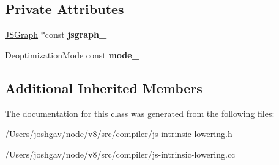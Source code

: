 \subsection*{Private Attributes}
\begin{DoxyCompactItemize}
\item 
\hyperlink{classv8_1_1internal_1_1compiler_1_1_j_s_graph}{J\+S\+Graph} $\ast$const {\bfseries jsgraph\+\_\+}\hypertarget{classv8_1_1internal_1_1compiler_1_1_j_s_intrinsic_lowering_a7fe42af2cfb580ff4c09088f0c885869}{}\label{classv8_1_1internal_1_1compiler_1_1_j_s_intrinsic_lowering_a7fe42af2cfb580ff4c09088f0c885869}

\item 
Deoptimization\+Mode const {\bfseries mode\+\_\+}\hypertarget{classv8_1_1internal_1_1compiler_1_1_j_s_intrinsic_lowering_ad3532415c48ff587fa99b48770b050dc}{}\label{classv8_1_1internal_1_1compiler_1_1_j_s_intrinsic_lowering_ad3532415c48ff587fa99b48770b050dc}

\end{DoxyCompactItemize}
\subsection*{Additional Inherited Members}


The documentation for this class was generated from the following files\+:\begin{DoxyCompactItemize}
\item 
/\+Users/joshgav/node/v8/src/compiler/js-\/intrinsic-\/lowering.\+h\item 
/\+Users/joshgav/node/v8/src/compiler/js-\/intrinsic-\/lowering.\+cc\end{DoxyCompactItemize}
